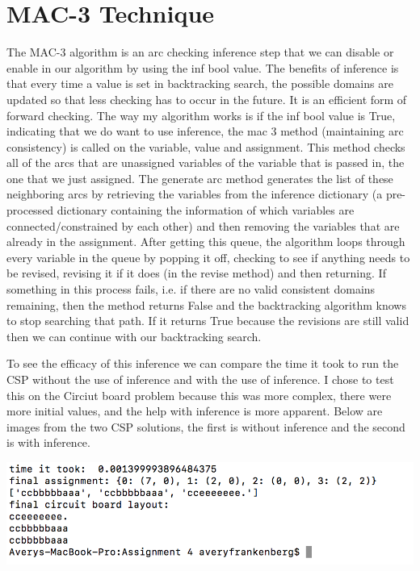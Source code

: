 \documentclass{article}
\begin{document}
\section{MAC-3 Technique}
The MAC-3 algorithm is an arc checking inference step that we can disable or enable in our algorithm by using the inf bool value. The benefits of inference is that every time a value is set in backtracking search, the possible domains are updated so that less checking has to occur in the future. It is an efficient form of forward checking. The way my algorithm works is if the inf bool value is True, indicating that we do want to use inference, the mac 3 method (maintaining arc consistency) is called on the variable, value and assignment. This method checks all of the arcs that are unassigned variables of the variable that is passed in, the one that we just assigned. The generate arc method generates the list of these neighboring arcs by retrieving the variables from the inference dictionary (a pre-processed dictionary containing the information of which variables are connected/constrained by each other) and then removing the variables that are already in the assignment. After getting this queue, the algorithm loops through every variable in the queue by popping it off, checking to see if anything needs to be revised, revising it if it does (in the revise method) and then returning. If something in this process fails, i.e. if there are no valid consistent domains remaining, then the method returns False and the backtracking algorithm knows to stop searching that path. If it returns True because the revisions are still valid then we can continue with our backtracking search.

To see the efficacy of this inference we can compare the time it took to run the CSP without the use of inference and with the use of inference. I chose to test this on the Circiut board problem because this was more complex, there were more initial values, and the help with inference is more apparent. Below are images from the two CSP solutions, the first is without inference and the second is with inference.  

\includegraphics[width=\textwidth]{CircuitBoard_withoutInf.png}
\end{document}
